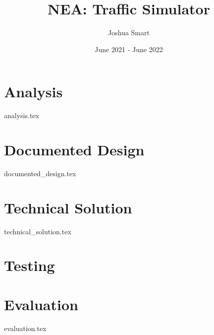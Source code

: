 \documentclass{report}
\title{NEA: Traffic Simulator}
\author{Joshua Smart}
\date{June 2021 - June 2022}
\begin{document}
    \begin{titlepage}
        \maketitle
    \end{titlepage}

    \tableofcontents

    \setparagraphstyling
    \chapter{Analysis}
        {analysis.tex}

    \chapter{Documented Design}
        {documented_design.tex}

    \chapter{Technical Solution}
        {technical_solution.tex}

    \chapter{Testing}

    \chapter{Evaluation}
        {evaluation.tex}

    \printbibliography
\end{document}

